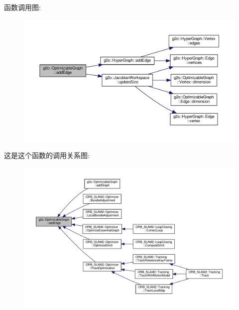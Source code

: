 函数调用图\-:
\nopagebreak
\begin{figure}[H]
\begin{center}
\leavevmode
\includegraphics[width=350pt]{structg2o_1_1OptimizableGraph_a6831ed69fce3dba691f53302a2813070_cgraph}
\end{center}
\end{figure}




这是这个函数的调用关系图\-:
\nopagebreak
\begin{figure}[H]
\begin{center}
\leavevmode
\includegraphics[width=350pt]{structg2o_1_1OptimizableGraph_a6831ed69fce3dba691f53302a2813070_icgraph}
\end{center}
\end{figure}


